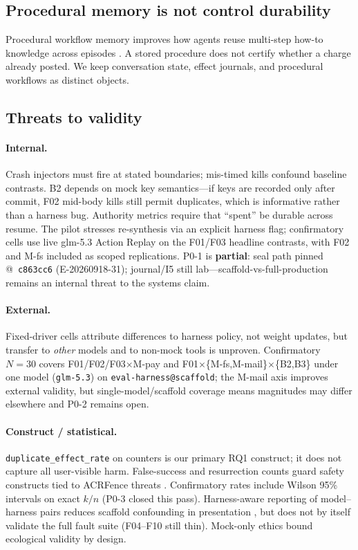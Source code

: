 \documentclass[11pt,a4paper]{article}
\begin{document}
\subsection{Procedural memory is not control durability}

Procedural workflow memory improves how agents reuse multi-step how-to
knowledge across episodes \cite{awm2025}. A stored procedure does not
certify whether a charge already posted. We keep conversation state, effect
journals, and procedural workflows as distinct objects.

\subsection{Threats to validity}

\paragraph{Internal.}
Crash injectors must fire at stated boundaries; mis-timed kills confound
baseline contrasts. B2 depends on mock key semantics---if keys are recorded
only after commit, F02 mid-body kills still permit duplicates, which is
informative rather than a harness bug. Authority metrics require that
``spent'' be durable across resume. The pilot stresses re-synthesis via an
explicit harness flag; confirmatory cells use live glm-5.3 Action Replay
on the F01/F03 headline contrasts, with F02 and M-fs included as scoped replications.
P0-1 is \textbf{partial}: seal path pinned @~\texttt{c863cc6}
(E-20260918-31); journal/I5 still lab---scaffold-vs-full-production remains
an internal threat to the systems claim.

\paragraph{External.}
Fixed-driver cells attribute differences to harness policy, not weight
updates, but transfer to \emph{other} models and to non-mock tools is
unproven. Confirmatory $N{=}30$ covers F01/F02/F03$\times$M-pay and
F01$\times$\{M-fs,M-mail\}$\times$\{B2,B3\} under one model
(\texttt{glm-5.3}) on \texttt{eval-harness@scaffold}; the M-mail axis improves
external validity, but single-model/scaffold coverage means magnitudes may
differ elsewhere and P0-2 remains open.

\paragraph{Construct / statistical.}
\texttt{duplicate\_effect\_rate} on counters is our primary RQ1 construct;
it does not capture all user-visible harm. False-success and resurrection
counts guard safety constructs tied to ACRFence threats
\cite{acrfence2026}. Confirmatory rates include Wilson 95\% intervals on
exact $k/n$ (P0-3 closed this pass). Harness-aware reporting of model--harness pairs reduces
scaffold confounding in presentation \cite{harnessbench2026}, but does not
by itself validate the full fault suite (F04--F10 still thin). Mock-only
ethics bound ecological validity by design.
\end{document}
